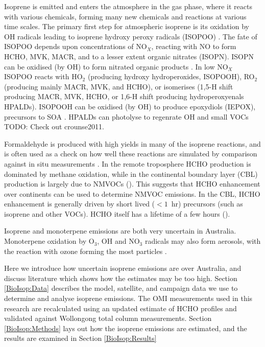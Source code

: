   Isoprene is emitted and enters the atmosphere in the gas phase, where it reacts with various chemicals, forming many new chemicals and reactions at various time scales.
  The primary first step for atmospheric isoprene is its oxidation by OH radicals leading to isoprene hydroxy peroxy radicals (ISOPOO) \citep{Wolfe2016,Marvin2017}.
  The fate of ISOPOO depends upon concentrations of NO$_X$, reacting with NO to form HCHO, MVK, MACR, and to a lesser extent organic nitrates (ISOPN).
  ISOPN can be oxidised (by OH) to form nitrated organic products \citep{Paulot2009a}.
  In low NO$_X$ ISOPOO reacts with HO$_2$ (producing hydroxy hydroperoxides, ISOPOOH), RO$_2$ (producing mainly MACR, MVK, and HCHO), or isomerises (1,5-H shift producing MACR, MVK, HCHO, or 1,6-H shift producing hydroperoxyenals HPALDs). 
  ISOPOOH can be oxidised (by OH) to produce epoxydiols (IEPOX), precursors to SOA \citep{Paulot2009b}. 
  HPALDs can photolyse to regenrate OH and small VOCs \citep{Crounse2011, Wolfe2012, Peeters2014} TODO: Check out crounse2011.
  
  Formaldehyde is produced with high yields in many of the isoprene reactions, and is often used as a check on how well these reactions are simulated by comparison against in situ measurements \citep{Marvin2017}.
  In the remote troposphere HCHO production is dominated by methane oxidation, while in the continental boundary layer (CBL) production is largely due to NMVOCs (\cite{Abbot2003, Kefauver2014}).
  This suggests that HCHO enhancement over continents can be used to determine NMVOC emissions.
  In the CBL, HCHO enhancement is generally driven by short lived ($<1$~hr) precursors (such as isoprene and other VOCs).
  HCHO itself has a lifetime of a few hours (\cite{Kefauver2014}).
  
  Isoprene and monoterpene emissions are both very uncertain in Australia.
  Monoterpene oxidation by O$_3$, OH and NO$_3$ radicals may also form aerosols, with the reaction with ozone forming the most particles \citep{Kanakidou2005}.
  
  Here we introduce how uncertain isoprene emissions are over Australia, and discuss literature which shows how the estimates may be too high.
  Section \ref{BioIsop:Data} describes the model, satellite, and campaign data we use to determine and analyse isoprene emissions.
  The OMI measurements used in this research are recalculated using an updated estimate of HCHO profiles and validated against Wollongong total column measurements.
  Section \ref{BioIsop:Methods} lays out how the isoprene emissions are estimated, and the results are examined in Section \ref{BioIsop:Results}
  
